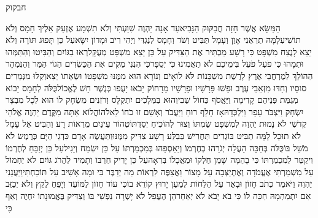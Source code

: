 \documentclass[../main/main.tex]{subfiles}
\begin{document}
\Incipit{}חבקוק\par
\vspace{\afterchapskip}
\RTLmulticolcolumns
\begin{multicols}{\ncols}
הַמַּשָּׂא אֲשֶׁר חָזָה חֲבַקּוּק הַנָּבִיא\PreVerseSpace{}עַד אָנָה יַהְוֶה שִׁוַּעְתִּי וְלֹא תִשְׁמָע אֶזְעַק אֵלֶיךָ חָמָס וְלֹא תוֹשִׁיעַ\PreVerseSpace{}לָמָּה תַרְאֵנִי אָוֶן וְעָמָל תַּבִּיט וְשֹׁד וְחָמָס לְנֶגְדִּי וַיְהִי רִיב וּמָדוֹן יִשָּׂא\PreVerseSpace{}עַל כֵּן תָּפוּג תּוֹרָה וְלֹא יֵצֵא לָנֶצַח מִשְׁפָּט כִּי רָשָׁע מַכְתִּיר אֶת הַצַּדִּיק עַל כֵּן יֵצֵא מִשְׁפָּט מְעֻקָּל\PreVerseSpace{}רְאוּ בַגּוֹיִם וְהַבִּיטוּ וְהִתַּמְּהוּ וּתְמָהוּ\SubEnd{} כִּי פֹעַל פֹּעֵל בִּימֵיכֶם לֹא תַאֲמִינוּ כִּי יְסֻפָּר\PreVerseSpace{}כִּי הִנְנִי מֵקִים אֶת הַכַּשְׂדִּים הַגּוֹי הַמַּר וְהַנִּמְהָר הַהוֹלֵךְ לְמֶרְחֲבֵי אֶרֶץ לָרֶשֶׁת מִשְׁכָּנוֹת לֹּא לוֹ\PreVerseSpace{}אָיֹם וְנוֹרָא הוּא מִמֶּנּוּ מִשְׁפָּטוֹ וּשְׂאֵתוֹ יֵצֵא\PreVerseSpace{}וְקַלּוּ מִנְּמֵרִים סוּסָיו וְחַדּוּ מִזְּאֵבֵי עֶרֶב וּפָשׁוּ פָּרָשָׁיו וּפָרָשָׁיו מֵרָחוֹק יָבֹאוּ יָעֻפוּ כְּנֶשֶׁר חָשׁ לֶאֱכוֹל\PreVerseSpace{}כֻּלֹּה לְחָמָס יָבוֹא מְגַמַּת פְּנֵיהֶם קָדִימָה וַיֶּאֱסֹף כַּחוֹל שֶׁבִי\PreVerseSpace{}וְהוּא בַּמְּלָכִים יִתְקַלָּס וְרֹזְנִים מִשְׂחָק לוֹ הוּא לְכָל מִבְצָר יִשְׂחָק וַיִּצְבֹּר עָפָר וַיִּלְכְּדָהּ\PreVerseSpace{}אָז חָלַף רוּחַ וַיַּעֲבֹר וְאָשֵׁם זוּ כֹחוֹ לֵאלֹהוֹ\PreVerseSpace{}הֲלוֹא אַתָּה מִקֶּדֶם יַהְוֶה אֱלֹהַי קְדֹשִׁי לֹא נָמוּת יַהְוֶה לְמִשְׁפָּט שַׂמְתּוֹ וְצוּר לְהוֹכִיחַ יְסַדְתּוֹ\PreVerseSpace{}טְהוֹר עֵינַיִם מֵרְאוֹת רָע וְהַבִּיט אֶל עָמָל לֹא תוּכָל לָמָּה תַבִּיט בּוֹגְדִים תַּחֲרִישׁ בְּבַלַּע רָשָׁע צַדִּיק מִמֶּנּוּ\PreVerseSpace{}וַתַּעֲשֶׂה אָדָם כִּדְגֵי הַיָּם כְּרֶמֶשׂ לֹא מֹשֵׁל בּוֹ\PreVerseSpace{}כֻּלֹּה בְּחַכָּה הֵעֲלָה יְגֹרֵהוּ בְחֶרְמוֹ וְיַאַסְפֵהוּ בְּמִכְמַרְתּוֹ עַל כֵּן יִשְׂמַח וְיָגִיל\PreVerseSpace{}עַל כֵּן יְזַבֵּחַ לְחֶרְמוֹ וִיקַטֵּר לְמִכְמַרְתּוֹ כִּי בָהֵמָּה שָׁמֵן חֶלְקוֹ וּמַאֲכָלוֹ בְּרִאָה\PreVerseSpace{}עַל\SubEnd{} כֵּן יָרִיק חַרְבּוֹ\SubEnd{} וְתָמִיד לַהֲרֹג גּוֹיִם לֹא יַחְמוֹל \ClosedSection{}עַל מִשְׁמַרְתִּי אֶעֱמֹדָה וְאֶתְיַצְּבָה עַל מָצוֹר וַאֲצַפֶּה לִרְאוֹת מַה יְדַבֶּר בִּי וּמָה אָשִׁיב עַל תּוֹכַחְתִּי\PreVerseSpace{}וַיַּעֲנֵנִי יַהְוֶה וַיֹּאמֶר כְּתֹב חָזוֹן וּבָאֵר עַל הַלֻּחוֹת לְמַעַן יָרוּץ קוֹרֵא בוֹ\PreVerseSpace{}כִּי עוֹד חָזוֹן לַמּוֹעֵד וְיָפֵחַ לַקֵּץ וְלֹא יְכַזֵּב אִם יִתְמַהְמָהּ חַכֵּה לוֹ כִּי בֹא יָבֹא לֹא יְאַחֵר\PreVerseSpace{}הֵן הֶעֱפִל\SubEnd{} לֹא יָשְׁרָה נַפְשִׁי\SubEnd{} בּוֹ וְצַדִּיק בֶּאֱמוּנָתוֹ יִחְיֶה \ClosedSection{}וְאַף כִּי 
\end{multicols}
\end{document}
